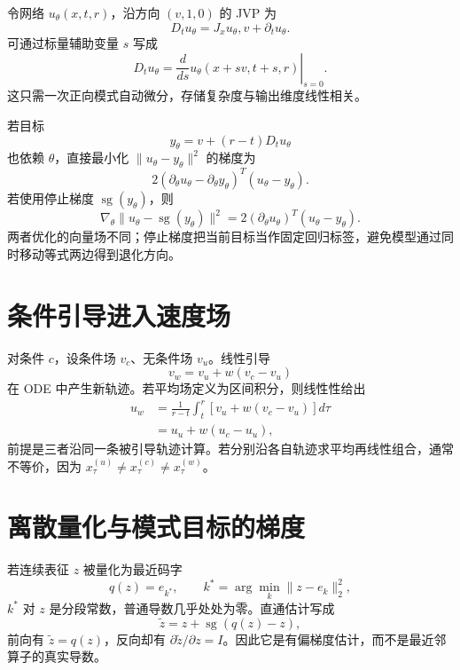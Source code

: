 \documentclass[11pt]{article}
\numberwithin{equation}{section}
\newcommand{\1}{\mathbf{1}}
\begin{document}
令网络 $u_\theta(x,t,r)$，沿方向 $(v,1,0)$ 的 JVP 为
\begin{equation}
 D_tu_\theta=J_xu_\theta,v+\partial_tu_\theta.
\end{equation}
可通过标量辅助变量 $s$ 写成
\begin{equation}
 D_tu_\theta
 =\left.\frac{d}{ds}u_\theta(x+sv,t+s,r)\right|_{s=0}.
\end{equation}
这只需一次正向模式自动微分，存储复杂度与输出维度线性相关。

若目标
\begin{equation}
 y_\theta=v+(r-t)D_tu_\theta
\end{equation}
也依赖 $\theta$，直接最小化
$\|u_\theta-y_\theta\|^2$ 的梯度为
\begin{equation}
 2(\partial_\theta u_\theta-\partial_\theta y_\theta)^T
 (u_\theta-y_\theta).
\end{equation}
若使用停止梯度 $\operatorname{sg}(y_\theta)$，则
\begin{equation}
 \nabla_\theta\|u_\theta-\operatorname{sg}(y_\theta)\|^2
 =2(\partial_\theta u_\theta)^T(u_\theta-y_\theta).
\end{equation}
两者优化的向量场不同；停止梯度把当前目标当作固定回归标签，避免模型通过同时移动等式两边得到退化方向。

\section{条件引导进入速度场}

对条件 $c$，设条件场 $v_c$、无条件场 $v_u$。线性引导
\begin{equation}
 v_w=v_u+w(v_c-v_u)
\end{equation}
在 ODE 中产生新轨迹。若平均场定义为区间积分，则线性性给出
\begin{align}
 u_w
 &=\frac1{r-t}\int_t^r[v_u+w(v_c-v_u)]d\tau\\
 &=u_u+w(u_c-u_u),
\end{align}
前提是三者沿同一条被引导轨迹计算。若分别沿各自轨迹求平均再线性组合，通常不等价，因为
$x_\tau^{(u)}\ne x_\tau^{(c)}\ne x_\tau^{(w)}$。

\section{离散量化与模式目标的梯度}

若连续表征 $z$ 被量化为最近码字
\begin{equation}
 q(z)=e_{k^*},\qquad
 k^*=\arg\min_k\|z-e_k\|_2^2,
\end{equation}
$k^*$ 对 $z$ 是分段常数，普通导数几乎处处为零。直通估计写成
\begin{equation}
 \widetilde z=z+\operatorname{sg}(q(z)-z),
\end{equation}
前向有 $\widetilde z=q(z)$，反向却有
$\partial\widetilde z/\partial z=I$。因此它是有偏梯度估计，而不是最近邻算子的真实导数。
\end{document}
